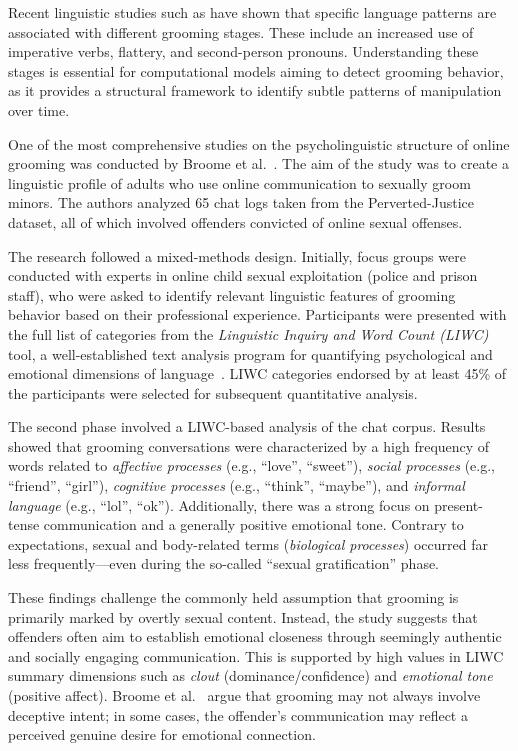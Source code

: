Recent linguistic studies such as \parencite{black2015linguistic} have shown that specific language patterns are associated with different grooming stages. These include an increased use of imperative verbs, flattery, and second-person pronouns. Understanding these stages is essential for computational models aiming to detect grooming behavior, as it provides a structural framework to identify subtle patterns of manipulation over time.



One of the most comprehensive studies on the psycholinguistic structure of online grooming was conducted by Broome et al.~\cite{broome2020psycholinguistic}. The aim of the study was to create a linguistic profile of adults who use online communication to sexually groom minors. The authors analyzed 65 chat logs taken from the Perverted-Justice dataset, all of which involved offenders convicted of online sexual offenses.

The research followed a mixed-methods design. Initially, focus groups were conducted with experts in online child sexual exploitation (police and prison staff), who were asked to identify relevant linguistic features of grooming behavior based on their professional experience. Participants were presented with the full list of categories from the \textit{Linguistic Inquiry and Word Count (LIWC)} tool, a well-established text analysis program for quantifying psychological and emotional dimensions of language~\cite{pennebaker2015liwc}. LIWC categories endorsed by at least 45\% of the participants were selected for subsequent quantitative analysis.

The second phase involved a LIWC-based analysis of the chat corpus. Results showed that grooming conversations were characterized by a high frequency of words related to \textit{affective processes} (e.g., ``love'', ``sweet''), \textit{social processes} (e.g., ``friend'', ``girl''), \textit{cognitive processes} (e.g., ``think'', ``maybe''), and \textit{informal language} (e.g., ``lol'', ``ok''). Additionally, there was a strong focus on present-tense communication and a generally positive emotional tone. Contrary to expectations, sexual and body-related terms (\textit{biological processes}) occurred far less frequently—even during the so-called ``sexual gratification'' phase.

These findings challenge the commonly held assumption that grooming is primarily marked by overtly sexual content. Instead, the study suggests that offenders often aim to establish emotional closeness through seemingly authentic and socially engaging communication. This is supported by high values in LIWC summary dimensions such as \textit{clout} (dominance/confidence) and \textit{emotional tone} (positive affect). Broome et al.~\cite{broome2020psycholinguistic} argue that grooming may not always involve deceptive intent; in some cases, the offender’s communication may reflect a perceived genuine desire for emotional connection.





